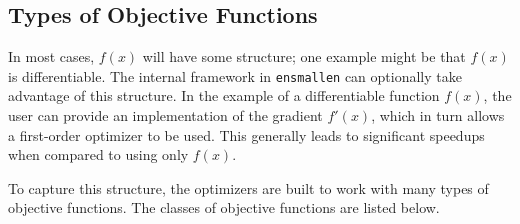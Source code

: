 \subsection{Types of Objective Functions}

In most cases, $f(x)$ will have
some structure; one example might be that $f(x)$ is differentiable.
The internal framework in {\tt ensmallen} can optionally take advantage of this structure.
In the example of a differentiable function $f(x)$,
the user can provide an implementation of the gradient $f'(x)$,
which in turn allows a first-order optimizer to be used.  This generally leads
to significant speedups when compared to using only $f(x)$.

To capture this structure, the optimizers are built to work with
many types of objective functions.  The classes of objective functions
are listed below.

